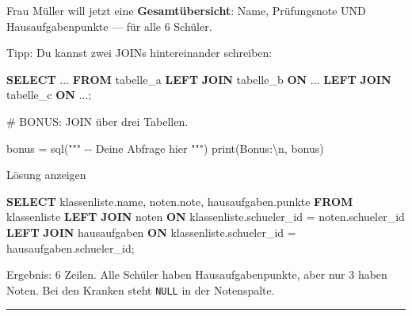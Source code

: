 \documentclass[
  nswissgerman,
  a4paper,
  DIV=11,
  numbers=noendperiod,
  ngerman]{scrreprt}
\newenvironment{Shaded}{\begin{snugshade}}{\end{snugshade}}
\newcommand{\BuiltInTok}[1]{\textcolor[rgb]{0.00,0.23,0.31}{#1}}
\newcommand{\CharTok}[1]{\textcolor[rgb]{0.13,0.47,0.30}{#1}}
\newcommand{\CommentTok}[1]{\textcolor[rgb]{0.37,0.37,0.37}{#1}}
\newcommand{\KeywordTok}[1]{\textcolor[rgb]{0.00,0.23,0.31}{\textbf{#1}}}
\newcommand{\NormalTok}[1]{\textcolor[rgb]{0.00,0.23,0.31}{#1}}
\newcommand{\OperatorTok}[1]{\textcolor[rgb]{0.37,0.37,0.37}{#1}}
\newcommand{\StringTok}[1]{\textcolor[rgb]{0.13,0.47,0.30}{#1}}
\begin{document}
Frau Müller will jetzt eine \textbf{Gesamtübersicht}: Name, Prüfungsnote
UND Hausaufgabenpunkte --- für alle 6 Schüler.

Tipp: Du kannst zwei JOINs hintereinander schreiben:

\begin{Shaded}
\begin{Highlighting}[numbers=left,,]
\KeywordTok{SELECT} \OperatorTok{..}\NormalTok{.}
\KeywordTok{FROM}\NormalTok{ tabelle\_a}
\KeywordTok{LEFT} \KeywordTok{JOIN}\NormalTok{ tabelle\_b }\KeywordTok{ON} \OperatorTok{..}\NormalTok{.}
\KeywordTok{LEFT} \KeywordTok{JOIN}\NormalTok{ tabelle\_c }\KeywordTok{ON} \OperatorTok{..}\NormalTok{.;}
\end{Highlighting}
\end{Shaded}

\begin{Shaded}
\begin{Highlighting}[numbers=left,,]
\CommentTok{\# BONUS: JOIN über drei Tabellen.}

\NormalTok{bonus }\OperatorTok{=}\NormalTok{ sql(}\StringTok{"""}
\StringTok{{-}{-} Deine Abfrage hier}
\StringTok{"""}\NormalTok{)}
\BuiltInTok{print}\NormalTok{(}\StringTok{\textquotesingle{}Bonus:}\CharTok{\textbackslash{}n}\StringTok{\textquotesingle{}}\NormalTok{, bonus)}
\end{Highlighting}
\end{Shaded}

Lösung anzeigen

\begin{Shaded}
\begin{Highlighting}[numbers=left,,]
\KeywordTok{SELECT}\NormalTok{ klassenliste.name, noten.note, hausaufgaben.punkte}
\KeywordTok{FROM}\NormalTok{ klassenliste}
\KeywordTok{LEFT} \KeywordTok{JOIN}\NormalTok{ noten}
  \KeywordTok{ON}\NormalTok{ klassenliste.schueler\_id }\OperatorTok{=}\NormalTok{ noten.schueler\_id}
\KeywordTok{LEFT} \KeywordTok{JOIN}\NormalTok{ hausaufgaben}
  \KeywordTok{ON}\NormalTok{ klassenliste.schueler\_id }\OperatorTok{=}\NormalTok{ hausaufgaben.schueler\_id;}
\end{Highlighting}
\end{Shaded}

Ergebnis: 6 Zeilen. Alle Schüler haben Hausaufgabenpunkte, aber nur 3
haben Noten. Bei den Kranken steht \texttt{NULL} in der Notenspalte.

\begin{center}\rule{0.5\linewidth}{0.5pt}\end{center}
\end{document}
